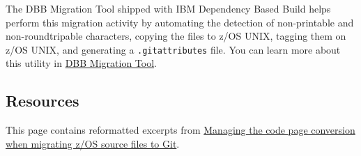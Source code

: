 \documentclass[
  letterpaper,
  DIV=11,
  numbers=noendperiod]{scrartcl}
\begin{document}
The DBB Migration Tool shipped with IBM Dependency Based Build helps
perform this migration activity by automating the detection of
non-printable and non-roundtripable characters, copying the files to
z/OS UNIX, tagging them on z/OS UNIX, and generating a
\texttt{.gitattributes} file. You can learn more about this utility in
\href{./dbb-migration-tool.md}{DBB Migration Tool}.

\hypertarget{resources}{%
\subsection{Resources}\label{resources}}

This page contains reformatted excerpts from
\href{https://www.ibm.com/support/pages/node/6591177}{Managing the code
page conversion when migrating z/OS source files to Git}.
\end{document}
